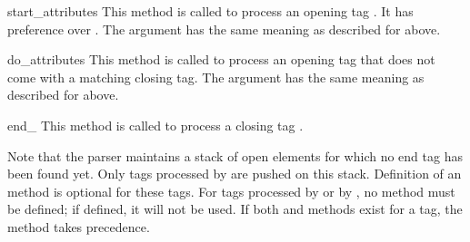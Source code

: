 \begin{methoddescni}{start_}{attributes}
This method is called to process an opening tag .  It has
preference over .  The
 argument has the same meaning as described for
 above.
\end{methoddescni}

\begin{methoddescni}{do_}{attributes}
This method is called to process an opening tag  that does
not come with a matching closing tag.  The  argument
has the same meaning as described for  above.
\end{methoddescni}

\begin{methoddescni}{end_}{}
This method is called to process a closing tag .
\end{methoddescni}

Note that the parser maintains a stack of open elements for which no
end tag has been found yet.  Only tags processed by
 are pushed on this stack.  Definition of an
 method is optional for these tags.  For tags
processed by  or by , no
 method must be defined; if defined, it will
not be used.  If both  and
 methods exist for a tag, the
 method takes precedence.
